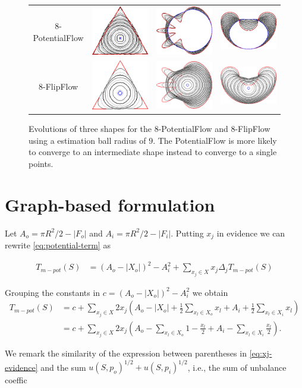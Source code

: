 \begin{figure}
\begin{tabular}{cccc}
$8$-PotentialFlow & \includegraphics[scale=0.25]{figures/chapter7/potential-flow/triangle/summary.pdf} & \includegraphics[scale=0.25]{figures/chapter7/potential-flow/flower/summary.pdf} & \includegraphics[scale=0.25]{figures/chapter7/potential-flow/bean/summary.pdf} \\
$8$-FlipFlow & \includegraphics[scale=0.25]{figures/chapter7/flip-flow/triangle/summary.pdf} & \includegraphics[scale=0.25]{figures/chapter7/flip-flow/flower/summary.pdf} & \includegraphics[scale=0.25]{figures/chapter7/flip-flow/bean/summary.pdf} \\
\end{tabular}
\caption{Evolutions of three shapes for the $8$-PotentialFlow and $8$-FlipFlow using a estimation ball radius of $9$. The PotentialFlow is more likely to converge to an intermediate shape instead to converge to a single points.}
\label{fig:potential-flow-flip-flow-comparison}
\end{figure}

\section{Graph-based formulation}

Let $A_o = \pi R^2 / 2 - |F_o|$ and $A_i = \pi R^2/2 - |F_i|$. Putting $x_j$ in evidence we can rewrite \eqref{eq:potential-term} as

\begin{align*}
	T_{m-pot}(S) &= (A_o - |X_o|)^2 - A_i^2 + \sum_{x_j \in X}{x_j\Delta_j T_{m-pot}(S)}
\end{align*} 

Grouping the constants in $c=(A_o - |X_o|)^2 - A_i^2$ we obtain
\begin{align}
	T_{m-pot}(S) &= c +\sum_{x_j \in X}{ 2x_j( A_o - |X_o| + \frac{1}{2}\sum_{x_l \in X_o}{x_l} + A_i + \frac{1}{2}\sum_{x_l \in X_i}{x_l})} \nonumber \\
	&= c +\sum_{x_j \in X}{2x_j( A_o - \sum_{x_l \in X_o}{1-\frac{x_l}{2}} + A_i - \sum_{x_l \in X_i}{\frac{x_l}{2}})}.
	\label{eq:xj-evidence}
\end{align}

We remark the similarity of the expression between parentheses in \eqref{eq:xj-evidence} and the sum $u(S,p_o)^{1/2} + u(S,p_i)^{1/2}$, i.e., the sum of unbalance coeffic